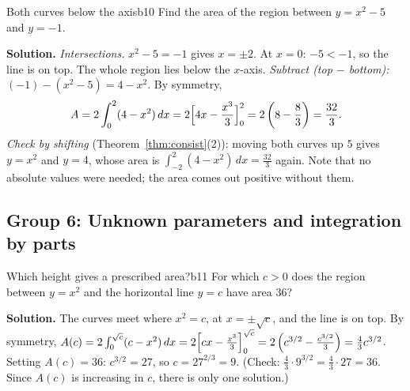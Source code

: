 \documentclass[11pt]{article}
\begin{document}
\begin{exmp}{Both curves below the axis}{b10}
Find the area of the region between $y=x^2-5$ and $y=-1$.

\textbf{Solution.} \emph{Intersections.} $x^2-5=-1$ gives $x=\pm2$. At $x=0$: $-5<-1$, so the line is on top. The whole region lies below the $x$-axis. \emph{Subtract (top $-$ bottom):} $(-1)-(x^2-5)=4-x^2$. By symmetry,
\[
A=2\int_0^2(4-x^2)\,dx=2\Bigl[4x-\frac{x^3}3\Bigr]_0^2=2\left(8-\frac83\right)=\frac{32}3 .
\]
\emph{Check by shifting} (Theorem~\ref{thm:consist}(2)): moving both curves up $5$ gives $y=x^2$ and $y=4$, whose area is $\int_{-2}^2(4-x^2)\,dx=\frac{32}3$ again. Note that no absolute values were needed; the area comes out positive without them.
\end{exmp}

\subsection*{Group 6: Unknown parameters and integration by parts}

\begin{exmp}{Which height gives a prescribed area?}{b11}
For which $c>0$ does the region between $y=x^2$ and the horizontal line $y=c$ have area $36$?

\textbf{Solution.} The curves meet where $x^2=c$, at $x=\pm\sqrt c$, and the line is on top. By symmetry, $A(c)=2\int_0^{\sqrt c}(c-x^2)\,dx=2\Bigl[cx-\frac{x^3}3\Bigr]_0^{\sqrt c}=2\left(c^{3/2}-\frac{c^{3/2}}3\right)=\frac43c^{3/2}$.
Setting $A(c)=36$: $c^{3/2}=27$, so $c=27^{2/3}=9$. (Check: $\frac43\cdot9^{3/2}=\frac43\cdot27=36$. Since $A(c)$ is increasing in $c$, there is only one solution.)
\end{exmp}
\end{document}
